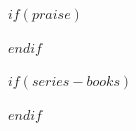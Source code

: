 


\frontmatter

$if(praise)$
  
  \clearpage{\thispagestyle{empty}\cleardoublepage}
$endif$




\clearpage


$if(series-books)$
  
$endif$

\clearpage{\thispagestyle{empty}\cleardoublepage}


